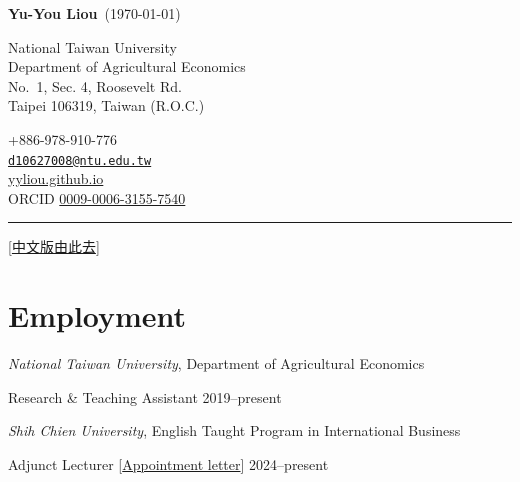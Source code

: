 \documentclass[11pt,letterpaper]{article}
\newlength{\cvindent}
\newlength{\cvcontactwidth}
\newcommand{\cvrule}{\par\noindent\hspace*{-\cvindent}%
  \rule{\dimexpr\textwidth+\cvindent\relax}{0.6pt}\par}
\begin{document}
\noindent\hspace*{-\cvindent}%
\begin{minipage}{\dimexpr\textwidth+\cvindent\relax}
  \raggedright
  {\large\bfseries Yu-You Liou}\ {\normalsize (\apstylekinda\today)}

  \vspace{3pt}

  \noindent\hspace*{\cvindent}%
  \begin{minipage}[t]{\dimexpr\linewidth-\cvindent-\cvcontactwidth-1em\relax}\small\raggedright
    National Taiwan University\\Department of Agricultural Economics\\No.~1, Sec. 4, Roosevelt Rd.\\Taipei 106319, Taiwan (R.O.C.)
  \end{minipage}\hfill
  \begin{minipage}[t]{\cvcontactwidth}\small\raggedleft
    +886-978-910-776\\\href{mailto:d10627008@ntu.edu.tw}{\nolinkurl{d10627008@ntu.edu.tw}}\\\href{https://yyliou.github.io}{yyliou.github.io}\\ORCID \href{https://orcid.org/0009-0006-3155-7540}{0009-0006-3155-7540}
  \end{minipage}
\end{minipage}

\vspace{6pt}
\cvrule
\vspace{-6pt}

{\raggedleft\small[\href{https://yyliou.github.io/yyliou/cv/cv_zh.pdf}{中文版由此去}]\par}

\hypertarget{employment}{%
\section{Employment}\label{employment}}

\emph{National Taiwan University}, Department of Agricultural Economics

Research \& Teaching Assistant \hfill \mbox{2019--present}

\emph{Shih Chien University}, English Taught Program in International Business

Adjunct Lecturer {[}\href{https://yyliou.github.io/yyliou/cv/doc/appointment-letters.pdf}{Appointment letter}{]} \hfill \mbox{2024--present}
\end{document}
